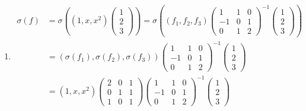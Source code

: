 \begin{enumerate}
\begin{enumerate}
              \item \begin{align*}
                        \sigma(f) & = \sigma\left((1, x, x^2)
                        \begin{pmatrix} 1 \\ 2 \\ 3 \end{pmatrix}\right)= \sigma\left((f_1, f_2, f_3)
                        \begin{pmatrix}
                            1  & 1 & 0 \\
                            -1 & 0 & 1 \\
                            0  & 1 & 2
                        \end{pmatrix}^{-1} \begin{pmatrix} 1 \\ 2 \\ 3 \end{pmatrix}\right) \\
                                  & = (\sigma(f_1), \sigma(f_2), \sigma(f_3))
                        \begin{pmatrix}
                            1  & 1 & 0 \\
                            -1 & 0 & 1 \\
                            0  & 1 & 2
                        \end{pmatrix}^{-1} \begin{pmatrix} 1 \\ 2 \\ 3 \end{pmatrix}        \\
                                  & = (1, x, x^2)
                        \begin{pmatrix}
                            2 & 0 & 1 \\
                            0 & 1 & 1 \\
                            1 & 0 & 1
                        \end{pmatrix}
                        \begin{pmatrix}
                            1  & 1 & 0 \\
                            -1 & 0 & 1 \\
                            0  & 1 & 2
                        \end{pmatrix}^{-1}
                        \begin{pmatrix} 1 \\ 2 \\ 3 \end{pmatrix}                           \\

\end{align*}
\end{enumerate}
\end{enumerate}
